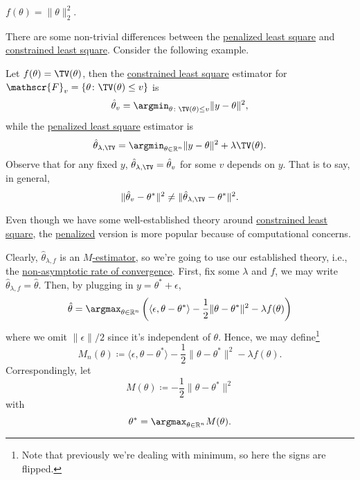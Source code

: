 \begin{eg}
	\(f(\theta ) = \lVert \theta \rVert _2^2 \).
\end{eg}

There are some non-trivial differences between the \hyperref[prb:penalized-LS]{penalized least square} and \hyperref[prb:constrained-LS]{constrained least square}. Consider the following example.

\begin{eg}
	Let \(f(\theta ) = \TV(\theta ) \), then the \hyperref[prb:constrained-LS]{constrained least square} estimator for \(\mathscr{F}_v = \{ \theta \colon \TV(\theta ) \leq v\} \) is
	\[
		\hat{\theta} _v = \argmin_{\theta \colon \TV(\theta ) \leq v} \lVert y - \theta \rVert ^2,
	\]
	while the \hyperref[prb:penalized-LS]{penalized least square} estimator is
	\[
		\hat{\theta} _{\lambda , \TV} = \argmin_{\theta \in \mathbb{R} ^n} \lVert y - \theta  \rVert ^2 + \lambda \TV(\theta ) .
	\]
	Observe that for any fixed \(y\), \(\hat{\theta} _{\lambda , \TV } = \hat{\theta} _v\) for some \(v\) depends on \(y\). That is to say, in general,
	\[
		\lVert \hat{\theta} _v - \theta ^{\ast}  \rVert ^2 \neq \lVert \hat{\theta} _{\lambda , \TV } - \theta ^{\ast} \rVert ^2 .
	\]
\end{eg}

\begin{remark}
	Even though we have some well-established theory around \hyperref[prb:constrained-LS]{constrained least square}, the \hyperref[prb:penalized-LS]{penalized} version is more popular because of computational concerns.
\end{remark}

Clearly, \(\hat{\theta} _{\lambda , f}\) is an \hyperref[prb:M-estimation]{\(M\)-estimator}, so we're going to use our established theory, i.e., the \hyperref[thm:non-asymptotic-rate-of-convergence]{non-asymptotic rate of convergence}. First, fix some \(\lambda \) and \(f\), we may write \(\hat{\theta} _{\lambda , f} = \hat{\theta} \). Then, by plugging in \(y = \theta ^{\ast} + \epsilon \),
\[
	\hat{\theta} = \argmax_{\theta \in \mathbb{R} ^n} \left( \langle \epsilon , \theta - \theta ^{\ast}  \rangle - \frac{1}{2} \lVert \theta - \theta ^{\ast}  \rVert ^2 - \lambda f(\theta )  \right)
\]
where we omit \(\lVert \epsilon \rVert / 2\) since it's independent of \(\theta \). Hence, we may define\footnote{Note that previously we're dealing with minimum, so here the signs are flipped.}
\[
	M_n(\theta ) \coloneqq \langle \epsilon , \theta - \theta ^{\ast} \rangle - \frac{1}{2} \lVert \theta - \theta ^{\ast} \rVert ^2 - \lambda f(\theta ).
\]
Correspondingly, let
\[
	M(\theta ) \coloneqq -\frac{1}{2} \lVert \theta - \theta ^{\ast}  \rVert ^2
\]
with
\[
	\theta ^{\ast} = \argmax_{\theta \in \mathbb{R} ^n} M(\theta ).
\]

